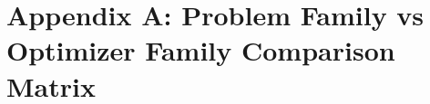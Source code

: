 \hypertarget{appendix-a-problem-family-vs-optimizer-family-comparison-matrix}{%
\section{Appendix A: Problem Family vs Optimizer Family Comparison Matrix}\label{appendix-a-problem-family-vs-optimizer-family-comparison-matrix}}


